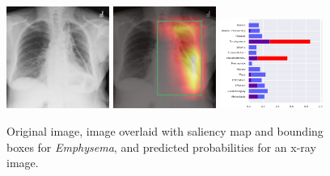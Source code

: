 \documentclass[8pt]{beamer}
\begin{document}
\begin{frame}
\begin{figure}[H]
  \centering
  \includegraphics[width=0.3\textwidth]{images/preds/emphysema}\hspace{0.01\textwidth}%
  \includegraphics[width=0.3\textwidth]{images/preds/emphysema_cam}\hspace{0.01\textwidth}%
  \includegraphics[width=0.3\textwidth]{images/preds/emphysema_probs}\\[0.01\textwidth]
  \caption{Original image, image overlaid with saliency map and bounding boxes
    for \emph{Emphysema}, and predicted probabilities for an x-ray image.}
  \label{examples_11}
\end{figure}
\end{frame}
\end{document}
